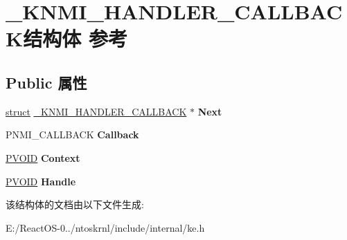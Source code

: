 \hypertarget{struct___k_n_m_i___h_a_n_d_l_e_r___c_a_l_l_b_a_c_k}{}\section{\+\_\+\+K\+N\+M\+I\+\_\+\+H\+A\+N\+D\+L\+E\+R\+\_\+\+C\+A\+L\+L\+B\+A\+C\+K结构体 参考}
\label{struct___k_n_m_i___h_a_n_d_l_e_r___c_a_l_l_b_a_c_k}
\subsection*{Public 属性}
\begin{DoxyCompactItemize}
\item 
\mbox{\label{struct___k_n_m_i___h_a_n_d_l_e_r___c_a_l_l_b_a_c_k_ab004927df960f86d99e357922c87f864}} 
\hyperlink{interfacestruct}{struct} \hyperlink{struct___k_n_m_i___h_a_n_d_l_e_r___c_a_l_l_b_a_c_k}{\+\_\+\+K\+N\+M\+I\+\_\+\+H\+A\+N\+D\+L\+E\+R\+\_\+\+C\+A\+L\+L\+B\+A\+CK} $\ast$ {\bfseries Next}
\item 
\mbox{\label{struct___k_n_m_i___h_a_n_d_l_e_r___c_a_l_l_b_a_c_k_a7df06ae4da2ca22a4a37db8b6309c72a}} 
P\+N\+M\+I\+\_\+\+C\+A\+L\+L\+B\+A\+CK {\bfseries Callback}
\item 
\mbox{\label{struct___k_n_m_i___h_a_n_d_l_e_r___c_a_l_l_b_a_c_k_a5a4271d662f540ddcd4aef4ec4479c4b}} 
\hyperlink{interfacevoid}{P\+V\+O\+ID} {\bfseries Context}
\item 
\mbox{\label{struct___k_n_m_i___h_a_n_d_l_e_r___c_a_l_l_b_a_c_k_aa9ee19e6537f539d7e739343ba6b293b}} 
\hyperlink{interfacevoid}{P\+V\+O\+ID} {\bfseries Handle}
\end{DoxyCompactItemize}


该结构体的文档由以下文件生成\+:\begin{DoxyCompactItemize}
\item 
E\+:/\+React\+O\+S-\/0../ntoskrnl/include/internal/ke.\+h\end{DoxyCompactItemize}
